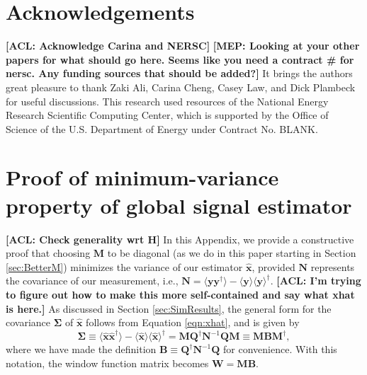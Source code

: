 \documentclass[twolcolumn,apj,iop,numberedappendix]{emulateapj}
\newcommand{\xhat}{\hat{\mathbf{x}}}
\newcommand{\N}{\mathbf{N}}
\newcommand{\Q}{\mathbf{Q}}
\newcommand{\M}{\mathbf{M}}
\newcommand{\W}{\mathbf{W}}
\newcommand{\acl}[1]{{\color{red} \textbf{[ACL:  #1]}}}
\newcommand{\mep}[1]{{\color{applegreen} \textbf{[MEP:  #1]}}}
\begin{document}
\section{Acknowledgements}
\acl{Acknowledge Carina and NERSC}
\mep{Looking at your other papers for what should go here. Seems like you need a contract \# for nersc. Any funding sources that should be added?}
It brings the authors great pleasure to thank Zaki Ali, Carina Cheng, Casey Law, and Dick Plambeck for useful discussions. This research used resources of the National Energy Research Scientific Computing Center, which is supported by the Office of Science of the U.S. Department of Energy under Contract No. BLANK. 


\appendix
\section{Proof of minimum-variance property of global signal estimator}
\label{minVarProof}
\acl{Check generality wrt H}
In this Appendix, we provide a constructive proof that choosing $\M$ to be diagonal (as we do in this paper starting in Section \ref{sec:BetterM}) minimizes the variance of our estimator $\xhat$, provided $\N$ represents the covariance of our measurement, i.e., $\N = \langle \mathbf{y} \mathbf{y}^\dagger \rangle - \langle \mathbf{y} \rangle \langle \mathbf{y} \rangle^\dagger$. \acl{I'm trying to figure out how to make this more self-contained and say what xhat is here.} As discussed in Section \ref{sec:SimResults}, the general form for the covariance $\boldsymbol \Sigma$ of $\xhat$ follows from Equation \eqref{eqn:xhat}, and is given by
\begin{equation}
\boldsymbol \Sigma \equiv \langle \xhat \xhat^\dagger \rangle - \langle \xhat \rangle \langle \xhat \rangle^\dagger = \M \Q^\dagger \N^{-1} \Q \M \equiv \M \mathbf{B} \M^\dagger,
\end{equation}
where we have made the definition $\mathbf{B} \equiv \Q^\dagger \N^{-1} \Q$ for convenience. With this notation, the window function matrix becomes $\W = \M \mathbf{B}$.
\end{document}
